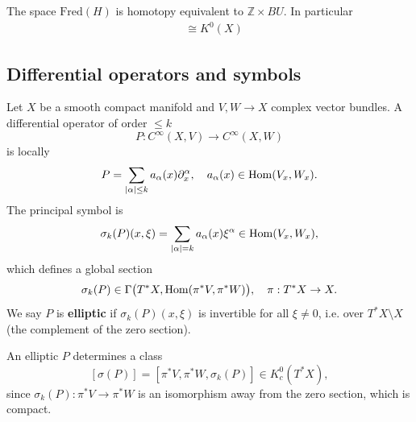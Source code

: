 \documentclass[12pt]{article}
\begin{document}
\begin{theorem}[Atiyah]
The space $\mathrm{Fred}(H)$ is homotopy equivalent to $\mathbb Z \times BU$. In particular \begin{align*}
    [X,\mathrm{Fred}(H)] &\cong K^0(X)
\end{align*}
\end{theorem}
\subsection{Differential operators and symbols}

Let \(X\) be a smooth compact manifold and \(V,W\to X\) complex vector bundles. A differential operator of order \(\le k\)
\[
P:C^\infty(X,V)\to C^\infty(X,W)
\]
is locally
\[
P=\sum_{|\alpha|\le k} a_\alpha(x)\partial_x^\alpha,
\quad a_\alpha(x)\in \operatorname{Hom}(V_x,W_x).
\]
The principal symbol is
\[
\sigma_k(P)(x,\xi)=\sum_{|\alpha|=k} a_\alpha(x)\xi^\alpha\in \operatorname{Hom}(V_x,W_x),
\]
which defines a global section
\[
\sigma_k(P)\in \Gamma\bigl(T^*X,\operatorname{Hom}(\pi^*V,\pi^*W)\bigr),
\quad \pi:T^*X\to X.
\]
We say \(P\) is \textbf{elliptic} if \(\sigma_k(P)(x,\xi)\) is invertible for all \(\xi\ne 0\), i.e. over \(T^*X\setminus X\) (the complement of the zero section).

An elliptic \(P\) determines a class
\[
[\sigma(P)]=[\pi^*V,\pi^*W,\sigma_k(P)]\in K_c^0(T^*X),
\]
since \(\sigma_k(P):\pi^*V\to\pi^*W\) is an isomorphism away from the zero section, which is compact.
\end{document}
